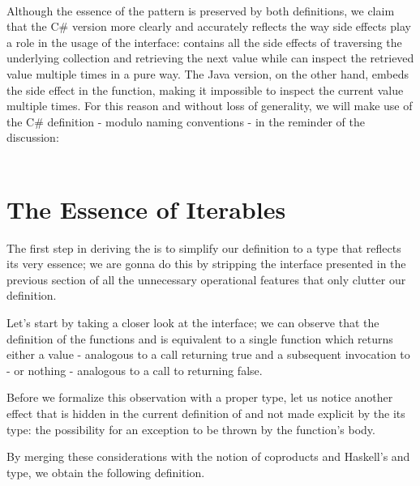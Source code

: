 \\

Although the essence of the pattern is preserved by both definitions, we claim that the C\# version more clearly and accurately reflects the way side effects play a role in the usage of the interface:  contains all the side effects of traversing the underlying collection and retrieving the next value while  can inspect the retrieved value multiple times in a pure way. The Java version, on the other hand, embeds the side effect in the  function, making it impossible to inspect the current value multiple times. For this reason and without loss of generality, we will make use of the C\# definition - modulo naming conventions - in the reminder of the discussion:\\

\\

\section{The Essence of Iterables}

The first step in deriving the  is to simplify our  definition to a type that reflects its very essence; we are gonna do this by stripping the interface presented in the previous section of all the unnecessary operational features that only clutter our definition.

Let's start by taking a closer look at the  interface; we can observe that the definition of the functions  and  is equivalent to a single function which returns either a value - analogous to a  call returning true and a subsequent invocation to  - or nothing - analogous to a call to  returning false. 

Before we formalize this observation with a proper type, let us notice another effect that is hidden in the current definition of  and not made explicit by the its type: the possibility for an exception to be thrown by the function's body. 

By merging these considerations with the notion of coproducts and Haskell's  and  type, we obtain the following definition.\\

\\

